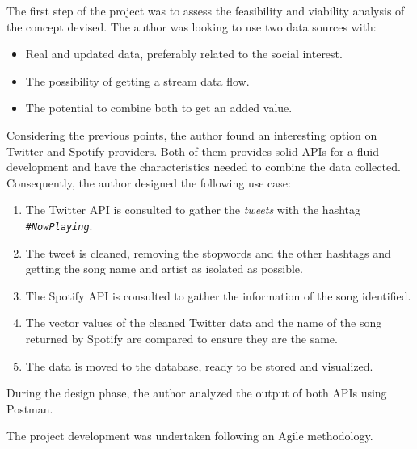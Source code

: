 

\nonzeroparskip The first step of the project was to assess the feasibility and viability analysis of the concept devised. The author was looking to use two data sources with:

\begin{itemize}
	\item Real and updated data, preferably related to the social interest.
	\item The possibility of getting a stream data flow.
	\item The potential to combine both to get an added value.
\end{itemize}

\nonzeroparskip Considering the previous points, the author found an interesting option on Twitter and Spotify providers. Both of them provides solid APIs for a fluid development and have the characteristics needed to combine the data collected. Consequently, the author designed the following use case:

\begin{enumerate}
	\item The Twitter API is consulted to gather the \textit{tweets} with the hashtag \texttt{\textit{\#NowPlaying}}.
	\item The tweet is cleaned, removing the stopwords and the other hashtags and getting the song name and artist as isolated as possible.
	\item The Spotify API is consulted to gather the information of the song identified.
	\item The vector values of the cleaned Twitter data and the name of the song returned by Spotify are compared to ensure they are the same.
	\item The data is moved to the database, ready to be stored and visualized.
\end{enumerate}

\nonzeroparskip During the design phase, the author analyzed the output of both APIs using Postman.


\nonzeroparskip The project development was undertaken following an Agile methodology.